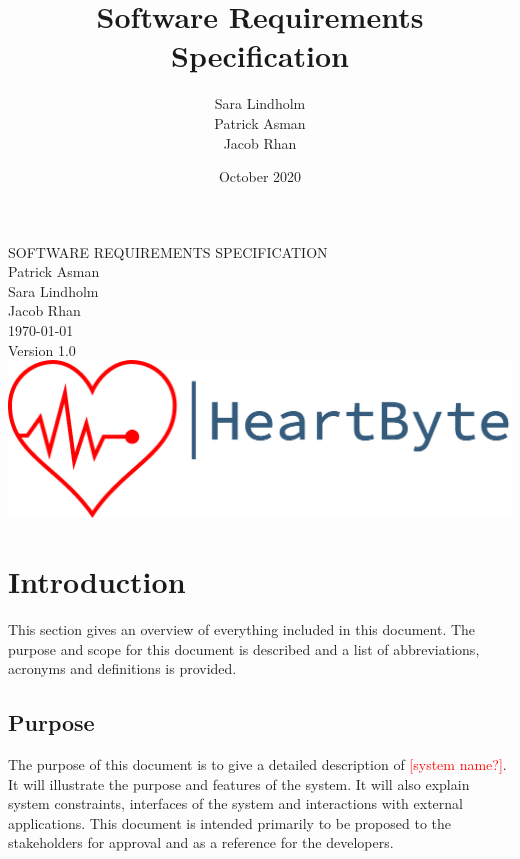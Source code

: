 \documentclass{scrreprt}
\title{Software Requirements Specification}
\author{Sara Lindholm \\ Patrick Asman \\ Jacob Rhan}
\date{October 2020}
\def\myversion{1.0 }
\begin{document}
\begin{titlepage}
    \begin{center}
    \begin{bfseries}
        \Huge{SOFTWARE REQUIREMENTS SPECIFICATION}\\
        \vspace{1.5cm}
        \LARGE Patrick Asman \\ Sara Lindholm \\ Jacob Rhan \\
        \vspace{1.5cm}
        \today\\
        \vspace{1.5cm}
        {Version \myversion}\\
        \vfill
        \includegraphics[width=\linewidth]{Pictures/logo.png} \\
    \end{bfseries}
    \end{center}
\end{titlepage}

\tableofcontents

\chapter{Introduction}
This section gives an overview of everything included in this document. The purpose and scope for this document is described and a list of abbreviations, acronyms and definitions is provided. 

\section{Purpose}
The purpose of this document is to give a detailed description of \textcolor{red}{[system name?]}. It will illustrate the purpose and features of the system. It will also explain system constraints, interfaces of the system and interactions with external applications. This document is intended primarily to be proposed to the stakeholders for approval and as a reference for the developers.
\end{document}

